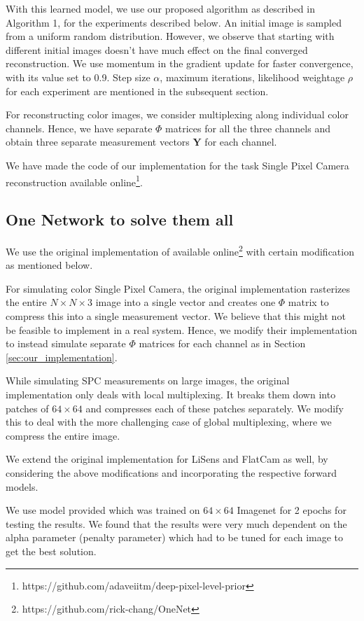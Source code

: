 \documentclass[journal,twoside]{IEEEtran}
\newcommand{\Y}{\mathbf{Y}}
\begin{document}
With this learned model, we use our proposed algorithm as described in Algorithm 1, for the experiments described below. An initial image is sampled from a uniform random distribution. However, we observe that starting with different initial images doesn't have much effect on the final converged reconstruction. We use momentum in the gradient update for faster convergence, with its value set to 0.9. Step size $\alpha$, maximum iterations, likelihood weightage $\rho$ for each experiment are mentioned in the subsequent section.

For reconstructing color images, we consider multiplexing along individual color channels. Hence, we have separate $\Phi$ matrices for all the three channels and obtain three separate measurement vectors $\Y$ for each channel.

We have made the code of our implementation for the task Single Pixel Camera reconstruction available online\footnote{https://github.com/adaveiitm/deep-pixel-level-prior}. 

\subsection{One Network to solve them all}
\label{sec:one_net_change}
We use the original implementation of \cite{chang2017one} available online\footnote{https://github.com/rick-chang/OneNet} with certain modification as mentioned below. 

For simulating color Single Pixel Camera, the original implementation rasterizes the entire $N \times N \times 3$ image into a single vector and creates one $\Phi$ matrix to compress this into a single measurement vector. We believe that this might not be feasible to implement in a real system. Hence, we modify their implementation to instead simulate separate $\Phi$ matrices for each channel as in Section \ref{sec:our_implementation}.  

While simulating SPC measurements on large images, the original implementation only deals with local multiplexing. It breaks them down into patches of $64 \times 64$ and compresses each of these patches separately. We modify this to deal with the more challenging case of global multiplexing, where we compress the entire image. 

We extend the original implementation for LiSens and FlatCam as well, by considering the above modifications and incorporating the respective forward models. 

We use model provided which was trained on $64 \times 64$ Imagenet for 2 epochs for testing the results. We found that the results were very much dependent on the alpha parameter (penalty parameter) which had to be tuned for each image to get the best solution. 
\end{document}
